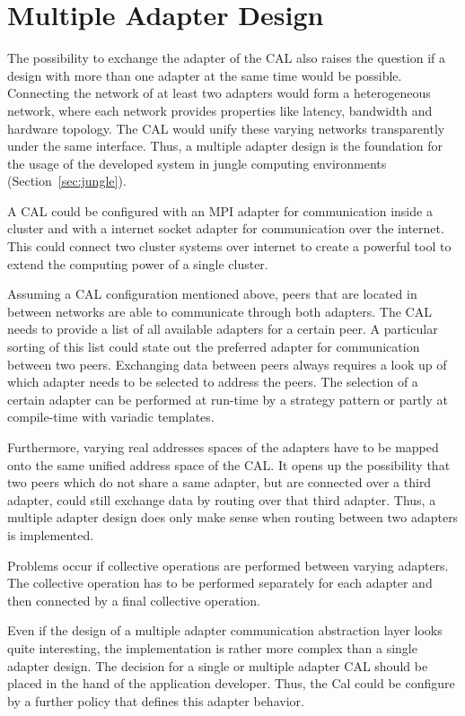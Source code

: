 \section*{Multiple Adapter Design}
The possibility to exchange the adapter of the CAL also raises
the question if a design with more than one adapter at the same time
would be possible. Connecting the network of at least two adapters
would form a heterogeneous network, where each network provides 
properties like latency, bandwidth and hardware topology. The CAL
would unify these varying networks transparently under the same
interface. Thus, a multiple adapter design is the foundation for the
usage of the developed system in jungle computing environments (Section~\ref{sec:jungle}).

A CAL could be configured with an MPI adapter for communication inside
a cluster and with a internet socket adapter for communication over
the internet. This could connect two cluster systems over internet
to create a powerful tool to extend the computing power of a single
cluster.

Assuming a CAL configuration mentioned above, peers that are located
in between networks are able to communicate through both adapters.
The CAL needs to provide a list of all available adapters for a
certain peer.  A particular sorting of this list could state out the
preferred adapter for communication between two peers. Exchanging data
between peers always requires a look up of which adapter needs to be
selected to address the peers. The selection of a certain adapter
can be performed at run-time by a strategy pattern or partly
at compile-time with variadic templates.

Furthermore, varying real addresses spaces of the adapters have
to be mapped onto the same unified address space of the CAL.  It opens
up the possibility that two peers which do not share a same adapter,
but are connected over a third adapter, could still exchange data by
routing over that third adapter. Thus, a multiple adapter design does
only make sense when routing between two adapters is implemented.

Problems occur if collective operations are performed between varying
adapters. The collective operation has to be performed separately for
each adapter and then connected by a final collective operation.

Even if the design of a multiple adapter communication abstraction layer
looks quite interesting, the implementation is rather more complex
than a single adapter design. The decision for a single or multiple
adapter CAL should be placed in the hand of the application developer.
Thus, the Cal could be configure by a further policy that defines this
adapter behavior.


